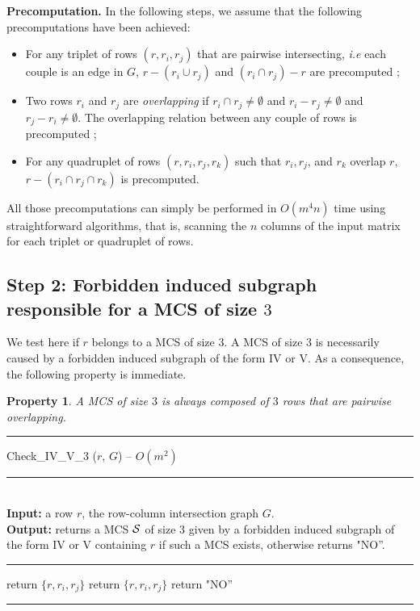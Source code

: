 \documentclass{article}
\newtheorem{property}{Property}
\begin{document}
\noindent
{\bf Precomputation.} In the following steps, we assume that the following 
precomputations have been achieved:
\begin{itemize}
\item For any triplet of rows $(r,r_i,r_j)$ that are pairwise intersecting,
\emph{i.e} each couple is an edge in $G$, 
$r-(r_i\cup r_j)$ and $(r_i\cap r_j)-r$ are precomputed ; 
\item Two rows  $r_i$ and $r_j$ are  \emph{overlapping} if  
$r_i\cap r_j \neq\emptyset$ and $r_i - r_j\neq\emptyset$ and 
$r_j - r_i\neq\emptyset$.
The overlapping relation between any couple of rows is precomputed ; 
\item For any quadruplet of rows $(r, r_i,r_j,r_k)$ such that $r_i,r_j$, and 
$r_k$ overlap $r$,  $r - (r_i\cap r_j\cap r_k)$ is precomputed.
\end{itemize}

All those precomputations can simply be performed in $O(m^4n)$ time
using straightforward algorithms, that is, scanning the $n$ columns of
the input matrix for each triplet or quadruplet of rows.  


\subsection{Step 2: Forbidden induced subgraph responsible for a MCS of size $3$}

We test here if $r$ belongs to a MCS of size $3$. A MCS of size $3$ is 
necessarily caused by a forbidden induced subgraph of the form IV or V.
As a consequence, the following property is immediate.

\begin{property}
A MCS of size $3$ is always composed of $3$ rows that are pairwise 
overlapping.
\label{mcs-3}
\end{property}


\begin{algorithm}[htpb]                    
\rule{11.7cm}{0.01cm}
\caption{Check\_IV\_V\_3 ($r$, $G$) -- $O(m^2)$}
\rule{11.7cm}{0.01cm}
\\               
{\bf Input:} a row $r$, the row-column intersection graph $G$.\\
{\bf Output:} returns a MCS ${\cal S}$ of size $3$ given by a forbidden 
induced subgraph of the form IV or V containing $r$ if such a MCS exists, 
otherwise returns  "NO''.
\rule{11.7cm}{0.01cm}              
\begin{algorithmic}[1] 
\STATE return $\{r,r_i,r_j\}$
\ENDIF
{}
\STATE return $\{r,r_i,r_j\}$
\ENDIF
\ENDFOR
\STATE return "NO''
\end{algorithmic}
\rule{11.7cm}{0.01cm}
\end{algorithm}
\end{document}
